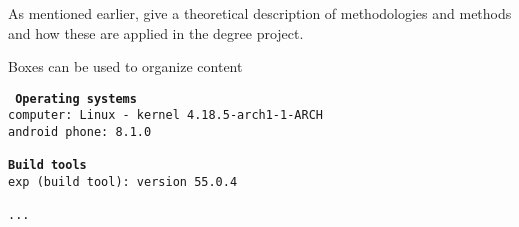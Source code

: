 As mentioned earlier, give a theoretical description of methodologies and methods and how these are applied in the degree project.

Boxes can be used to organize content
\begin{tcolorbox}[title={Development environment for stochastic model}]
	\tt{
		\textbf{Operating systems }\\
		computer: Linux - kernel 4.18.5-arch1-1-ARCH\\
		android phone: 8.1.0\\
		~\\
		\textbf{Build tools}\\
		exp (build tool): version 55.0.4\\
		~\\
		...
	}
\end{tcolorbox}